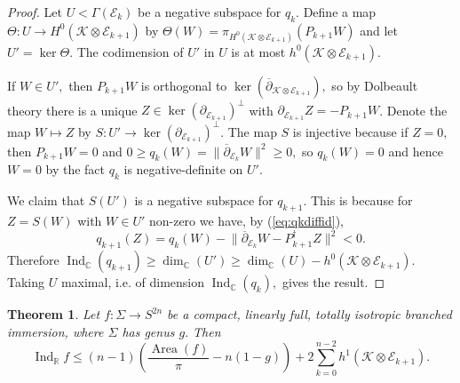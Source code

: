 \documentclass[11pt]{article}
\newtheorem{theorem}{Theorem}[section]
\theoremstyle{definition}
\newcommand{\R}{\mathbb{R}}
\newcommand{\C}{\mathbb{C}}
\newcommand{\del}{\partial}
\newcommand{\delbar}{\overline{\partial}}
\numberwithin{equation}{section}
\begin{document}
\begin{proof}
	Let $U < \Gamma(\mathcal{E}_k)$ be a negative subspace for $q_k.$ Define a map $\Theta : U \to H^0(\mathcal{K} \otimes \mathcal{E}_{k+1})$ by $\Theta(W) = \pi_{H^0(\mathcal{K} \otimes \mathcal{E}_{k+1})} (P_{k+1} W)$ and let $U' = \ker \Theta.$ The codimension of $U'$ in $U$ is at most $h^0(\mathcal{K} \otimes \mathcal{E}_{k+1}).$
	
	If $W \in U',$ then $P_{k+1} W$ is orthogonal to $\ker(\delbar_{\mathcal{K} \otimes \mathcal{E}_{k+1}}),$ so by Dolbeault theory there is a unique $Z \in \ker (\del_{\mathcal{E}_{k+1}})^\perp$ with $\del_{\mathcal{E}_{k+1}} Z = -P_{k+1} W$. Denote the map $W \mapsto Z$ by $S: U' \to \ker (\del_{\mathcal{E}_{k+1}})^\perp.$ The map $S$ is injective because if $Z = 0,$ then $P_{k+1} W = 0$ and $0 \geq q_k(W) = \lVert \delbar_{\mathcal{E}_k} W \rVert^2 \geq 0,$ so $q_k(W) = 0$ and hence $W = 0$ by the fact $q_{k}$ is negative-definite on $U'.$
	
	We claim that $S(U')$ is a negative subspace for $q_{k+1}.$ This is because for $Z = S(W)$ with $W \in U'$ non-zero we have, by (\ref{eq:qkdiffid}),
	\begin{equation*}
		q_{k+1}(Z) = q_k(W) - \lVert \delbar_{\mathcal{E}_k} W - P_{k+1}^\dagger Z \rVert^2 < 0.
	\end{equation*}
	Therefore $\operatorname{Ind}_\C (q_{k+1}) \geq \dim_{\C}(U') \geq \dim_{\C}(U) - h^0(\mathcal{K} \otimes \mathcal{E}_{k+1}).$ Taking $U$ maximal, i.e. of dimension $\operatorname{Ind}_\C(q_k),$ gives the result.
\end{proof}

\begin{theorem}\label{thm:upperbound}
	Let $f: \Sigma \to S^{2n}$ be a compact, linearly full, totally isotropic branched immersion, where $\Sigma$ has genus $g.$ Then
	\begin{equation*}
		\operatorname{Ind}_\R f \leq (n-1) \left( \frac{\operatorname{Area}(f)}{\pi} - n(1-g) \right) + 2 \sum_{k=0}^{n-2} h^1(\mathcal{K} \otimes \mathcal{E}_{k+1}).
	\end{equation*}
\end{theorem}
\end{document}
